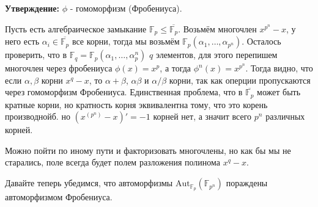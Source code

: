 \documentclass[a4paper, 12pt]{book}
\begin{document}
\textbf{Утверждение:} $\phi$ - гомоморфизм (Фробениуса).

Пусть есть алгебраическое замыкание $\mathbb{F}_p\le\overline{\mathbb{F}_p}$.
Возьмём многочлен $x^{p^n}-x$, у него есть $\alpha_i\in\overline{\mathbb{F}_p}$
все корни, тогда мы возьмём $\mathbb{F}_p(\alpha_1,\ldots,\alpha_{p^n})$.
Осталось проверить, что в $\mathbb{F}_q=\mathbb{F}_p(\alpha_1,\ldots,\alpha_p^n)$
$q$ элементов, для этого перепишем многочлен через фробениуса $\phi(x)=x^p$, а
тогда $\phi^n(x)=x^{p^n}$. Тогда видно, что если $\alpha,\beta$ корни $x^q-x$,
то $\alpha+\beta$, $\alpha\beta$ и $\alpha/\beta$ корни, так как оперции
пропускаются через гомоморфизм Фробениуса. Единственная проблема, что в
$\overline{\mathbb{F}_p}$ может быть кратные корни, но кратность корня
эквивалентна тому, что это корень производнойб. но $(x^(p^n)-x)'=-1$ корней нет,
а значит всего $p^n$ различных корней.

Можно пойти по иному пути и факторизовать многочлены, но как бы мы не старались,
поле всегда будет полем разложения полинома $x^q-x$.

Давайте теперь убедимся, что автоморфизмы $\text{Aut}_{\mathbb{F}_p}(
\mathbb{F}_{p^n})$ пораждены автоморфизмом Фробениуса.
\end{document}
